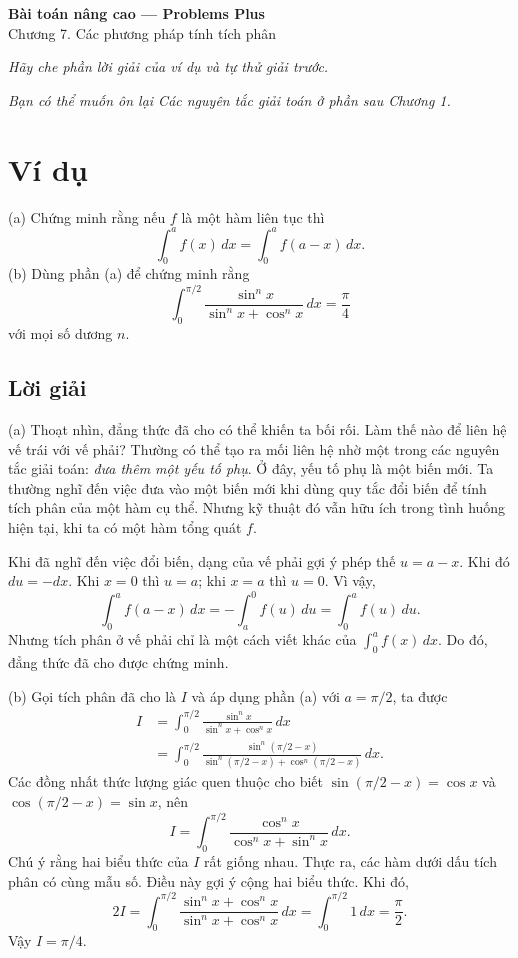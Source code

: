 \documentclass[12pt,a4paper]{article}
\begin{document}
\begin{center}{\Large\bfseries Bài toán nâng cao — Problems Plus}\\Chương 7. Các phương pháp tính tích phân\end{center}
\textit{Hãy che phần lời giải của ví dụ và tự thử giải trước.}

\textit{Bạn có thể muốn ôn lại Các nguyên tắc giải toán ở phần sau Chương 1.}
\section*{Ví dụ}
(a) Chứng minh rằng nếu $f$ là một hàm liên tục thì
\[\int_0^a f(x)\,dx=\int_0^a f(a-x)\,dx.\]
(b) Dùng phần (a) để chứng minh rằng
\[\int_0^{\pi/2}\frac{\sin^n x}{\sin^n x+\cos^n x}\,dx=\frac\pi4\]
với mọi số dương $n$.
\subsection*{Lời giải}
(a) Thoạt nhìn, đẳng thức đã cho có thể khiến ta bối rối. Làm thế nào để liên hệ vế trái với vế phải? Thường có thể tạo ra mối liên hệ nhờ một trong các nguyên tắc giải toán: \textit{đưa thêm một yếu tố phụ}. Ở đây, yếu tố phụ là một biến mới. Ta thường nghĩ đến việc đưa vào một biến mới khi dùng quy tắc đổi biến để tính tích phân của một hàm cụ thể. Nhưng kỹ thuật đó vẫn hữu ích trong tình huống hiện tại, khi ta có một hàm tổng quát $f$.

Khi đã nghĩ đến việc đổi biến, dạng của vế phải gợi ý phép thế $u=a-x$. Khi đó $du=-dx$. Khi $x=0$ thì $u=a$; khi $x=a$ thì $u=0$. Vì vậy,
\[\int_0^a f(a-x)\,dx=-\int_a^0 f(u)\,du=\int_0^a f(u)\,du.\]
Nhưng tích phân ở vế phải chỉ là một cách viết khác của $\int_0^a f(x)\,dx$. Do đó, đẳng thức đã cho được chứng minh.

(b) Gọi tích phân đã cho là $I$ và áp dụng phần (a) với $a=\pi/2$, ta được
\[\begin{aligned}
I&=\int_0^{\pi/2}\frac{\sin^n x}{\sin^n x+\cos^n x}\,dx\\
&=\int_0^{\pi/2}\frac{\sin^n(\pi/2-x)}{\sin^n(\pi/2-x)+\cos^n(\pi/2-x)}\,dx.
\end{aligned}\]
Các đồng nhất thức lượng giác quen thuộc cho biết $\sin(\pi/2-x)=\cos x$ và $\cos(\pi/2-x)=\sin x$, nên
\[I=\int_0^{\pi/2}\frac{\cos^n x}{\cos^n x+\sin^n x}\,dx.\]
Chú ý rằng hai biểu thức của $I$ rất giống nhau. Thực ra, các hàm dưới dấu tích phân có cùng mẫu số. Điều này gợi ý cộng hai biểu thức. Khi đó,
\[2I=\int_0^{\pi/2}\frac{\sin^n x+\cos^n x}{\sin^n x+\cos^n x}\,dx=\int_0^{\pi/2}1\,dx=\frac\pi2.\]
Vậy $I=\pi/4$.
\end{document}
